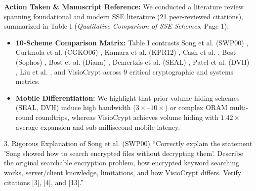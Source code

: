 \documentclass[11pt,a4paper]{article}
\begin{document}
\begin{responsebox}
\textbf{Action Taken \& Manuscript Reference:} We conducted a literature review spanning foundational and modern SSE literature (21 peer-reviewed citations), summarized in Table I (\emph{Qualitative Comparison of SSE Schemes}, Page 1):
\begin{itemize}[itemsep=2pt]
    \item \textbf{10-Scheme Comparison Matrix:} Table I contrasts Song et al. (SWP00) \cite{song2000}, Curtmola et al. (CGKO06) \cite{curtmola2006}, Kamara et al. (KPR12) \cite{kamara2012}, Cash et al. \cite{cash2013}, Bost (Sophos) \cite{bost2016sophos}, Bost et al. (Diana) \cite{bost2017diana}, Demertzis et al. (SEAL) \cite{demertzis2020seal}, Patel et al. (DVH) \cite{patel2023dvh}, Liu et al. \cite{li2021trustzone}, and VisioCrypt across 9 critical cryptographic and systems metrics.
    \item \textbf{Mobile Differentiation:} We highlight that prior volume-hiding schemes (SEAL, DVH) induce high bandwidth ($3\times$--$10\times$) or complex ORAM multi-round roundtrips, whereas VisioCrypt achieves volume hiding with $1.42\times$ average expansion and sub-millisecond mobile latency.
\end{itemize}
\end{responsebox}

\vspace{1em}

\begin{reviewbox}{3. Rigorous Explanation of Song et al. (SWP00)}
``Correctly explain the statement 'Song showed how to search encrypted files without decrypting them'. Describe the original searchable encryption problem, how encrypted keyword searching works, server/client knowledge, limitations, and how VisioCrypt differs. Verify citations [3], [4], and [13].''
\end{reviewbox}
\end{document}
